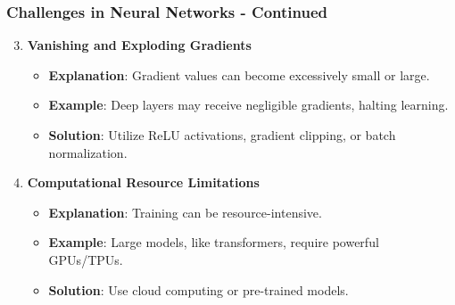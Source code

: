 \documentclass[aspectratio=169]{beamer}
\begin{document}
\begin{frame}[fragile]
    \frametitle{Challenges in Neural Networks - Continued}
    \begin{enumerate}
        \setcounter{enumi}{2} %
        
        \item \textbf{Vanishing and Exploding Gradients}
            \begin{itemize}
                \item \textbf{Explanation}: Gradient values can become excessively small or large.
                \item \textbf{Example}: Deep layers may receive negligible gradients, halting learning.
                \item \textbf{Solution}: Utilize ReLU activations, gradient clipping, or batch normalization.
            \end{itemize}
        
        \item \textbf{Computational Resource Limitations}
            \begin{itemize}
                \item \textbf{Explanation}: Training can be resource-intensive.
                \item \textbf{Example}: Large models, like transformers, require powerful GPUs/TPUs.
                \item \textbf{Solution}: Use cloud computing or pre-trained models.
            \end{itemize}
    \end{enumerate}
\end{frame}
\end{document}
